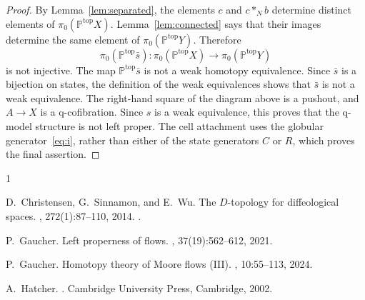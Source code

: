 \documentclass[12pt,a4paper]{amsart}
\newcommand{\Path}{\mathbb P^{\mathrm{top}}}
\theoremstyle{definition}
\begin{document}
\begin{proof}
By Lemma~\ref{lem:separated}, the elements \(c\) and \(c*_N b\) determine distinct elements of \(\pi_0(\Path X)\).  Lemma~\ref{lem:connected} says that their images determine the same element of \(\pi_0(\Path Y)\). Therefore
\[
 \pi_0(\Path\bar s):
 \pi_0(\Path X)\longrightarrow\pi_0(\Path Y)
\]
is not injective.  The map \(\Path\bar s\) is not a weak homotopy equivalence.  Since \(\bar s\) is a bijection on states, the definition of the weak equivalences shows that \(\bar s\) is not a weak equivalence. The right-hand square of the diagram above is a pushout, and \(A\to X\) is a q-cofibration.  Since \(s\) is a weak equivalence, this proves that the q-model structure is not left proper. The cell attachment uses the globular generator~\eqref{eq:i}, rather than either of the state generators \(C\) or \(R\), which proves the final assertion.
\end{proof}

\begin{thebibliography}{1}
	
	D.~Christensen, G.~Sinnamon, and E.~Wu.
	\newblock The {\(D\)}-topology for diffeological spaces.
	, 272(1):87--110, 2014.
	\newblock \href {https://doi.org/10.2140/pjm.2014.272.87}
	{}.
	
	P.~Gaucher.
	\newblock Left properness of flows.
	, 37(19):562--612, 2021.
	
	P.~Gaucher.
	\newblock Homotopy theory of {M}oore flows ({III}).
	, 10:55--113, 2024.
	
	A.~Hatcher.
	.
	\newblock Cambridge University Press, Cambridge, 2002.
	
\end{thebibliography}


% 
%  
\end{document}
